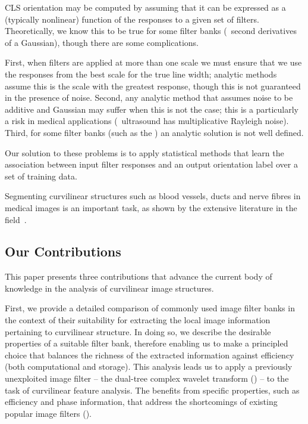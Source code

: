 
CLS orientation may be computed by assuming that it can be expressed as a (typically nonlinear) function of the responses to a given set of filters. Theoretically, we know this to be true for some filter banks (\eg~second derivatives of a Gaussian), though there are some complications.

First, when filters are applied at more than one scale we must ensure that we use the responses from the best scale for the true line width; analytic methods ~\cite{Karssemeijer_teBrake_TMI96,Mei_etal_IVC09} assume this is the scale with the greatest response, though this is not guaranteed in the presence of noise. Second, any analytic method that assumes noise to be additive and Gaussian may suffer when this is not the case; this is a particularly a risk in medical applications (\eg~ultrasound has multiplicative Rayleigh noise). Third, for some filter banks (such as the \dtcwt{}) an analytic solution is not well defined.

Our solution to these problems is to apply statistical methods that learn the association between input filter responses and an output orientation label over a set of training data.

Segmenting curvilinear structures such as blood vessels, ducts and nerve fibres in medical images is an important task, as shown by the extensive literature in the field~\cite{Papari_Petkov_IVC11,Staal_etal_TMI04,Ricci_Perfetti_TMI07}.


\subsection{Our Contributions}
This paper presents three contributions that advance the current body of knowledge in the analysis of curvilinear image structures.

First, we provide a detailed comparison of commonly used image filter banks in the context of their suitability for extracting the local image information pertaining to curvilinear structure. In doing so, we describe the desirable properties of a suitable filter bank, therefore enabling us to make a principled choice that balances the richness of the extracted information against efficiency (both computational and storage). This analysis leads us to apply a previously unexploited image filter -- the dual-tree complex wavelet transform (\dtcwt{}) -- to the task of curvilinear feature analysis. The \dtcwt{} benefits from specific properties, such as efficiency and phase information, that address the shortcomings of existing popular image filters ().

